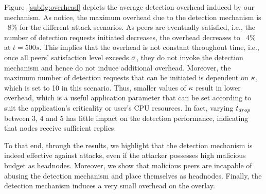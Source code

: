 Figure~\ref{subfig:overhead} depicts the average detection overhead induced by our mechanism. 
As notice, the maximum overhead due to the detection mechanism is ~8\% for the different attack scenarios.
As peers are eventually satisfied, i.e., the number of detection requests initiated decreases, the overhead decreases to ~4\% at $t=500s$.
This implies that the overhead is not constant throughout time, i.e., once all peers' satisfaction level exceeds $\sigma$, they do not invoke the detection mechanism and hence do not induce additional overhead. 
Moreover, the maximum number of detection requests that can be initiated is dependent on $\kappa$, which is set to 10 in this scenario.
Thus, smaller values of $\kappa$ result in lower overhead, which is a useful application parameter that can be set according to suit the application's criticality or user's CPU resources.
In fact, varying $t_{drop}$ between 3, 4 and 5 has little impact on the detection performance, indicating that nodes receive sufficient replies.

To that end, through the results, we highlight that the detection mechanism is indeed effective against \drop attacks, even if the attacker possesses high malicious budget as headnodes.
Moreover, we show that malicious peers are incapable of abusing the detection mechanism and place themselves as headnodes. Finally, the detection mechanism induces a very small overhead on the overlay.

